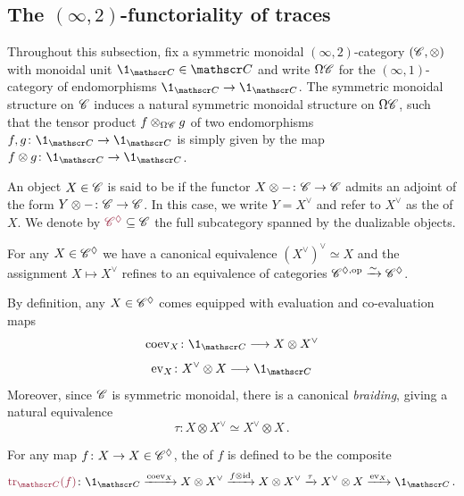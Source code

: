 
\subsection{The \texorpdfstring{$(\infty,2)$}{(infty,2)}-functoriality of traces}

Throughout this subsection, fix a symmetric monoidal $(\infty,2)$-category $(\mathscr{C},\otimes)$ with
monoidal unit $\1_{\cC} \in \cC$ and write $\Omega\mathscr{C}$ for the $(\infty,1)$-category of
endomorphisms $\1_{\cC} \to \1_{\cC}$. The symmetric monoidal structure on $\mathscr{C}$
induces a natural symmetric monoidal structure on $\Omega \mathscr{C}$, such that
the tensor product $f\otimes_{\Omega\mathscr{C}} g$ of two endomorphisms
$f,g\colon \1_{\cC} \to \1_{\cC}$ is simply given by the map $f\otimes g\colon \1_{\cC} \to \1_{\cC}$. 

\begin{defn}
  An object $X\in \mathscr{C}$ is said to be 
  if the functor $X\otimes - \colon \mathscr{C} \to \mathscr{C}$ admits an adjoint of the form
  $Y\otimes - \colon \mathscr{C} \to \mathscr{C}$. In this case, we write $Y= X^{\vee}$ and refer to $X^{\vee}$ as
  the  of $X$. We denote by $\mdef{\cC^{\dual}}\subseteq \cC$ the full subcategory
  spanned by the dualizable objects.
\end{defn}

\begin{rmk}
  For any $X\in \mathscr{C}^{\lozenge}$ we have a canonical equivalence $(X^{\vee})^{\vee}\simeq X$ and
  the assignment $X \mapsto X^{\vee}$ refines to an equivalence of categories
  $\mathscr{C}^{\lozenge, {\mathrm{op}}}\xrightarrow{\sim} \mathscr{C}^{\lozenge}$.
\end{rmk}

By definition, any $X\in \mathscr{C}^{\lozenge}$ comes equipped with evaluation and
co-evaluation maps
\[ \coev_{X}\colon \1_{\cC} \too X\otimes X^{\vee}\]
\[ \ev_{X}\colon X^{\vee} \otimes X \too \1_{\cC}\]
Moreover, since $\mathscr{C}$ is symmetric monoidal, there is a canonical \textit{braiding},
giving a natural equivalence
\[ \tau \colon X\otimes X^{\vee} \simeq X^{\vee} \otimes X \,.\]

\begin{defn}
  For any map $f\colon X\to X \in \mathscr{C}^{\lozenge}$, the  of $f$ is defined 
  to be the composite
  \[\mdef{\tr{f}{\cC}} \colon  \1_{\cC}  \xrightarrow{\coev_X}  X \otimes X^{\vee}
    \rar{f \otimes \id} X \otimes X^{\vee} \rar{\tau} X^{\vee} \otimes X 
    \rar{\ev_X} \1_{\cC}\,.\]
\end{defn}



